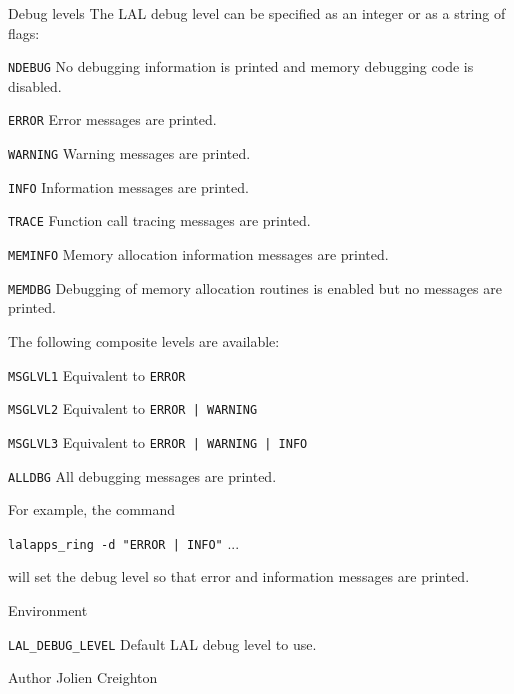 \begin{entry}
\item[Debug levels]
The LAL debug level can be specified as an integer or as a string of flags:
\begin{entry}
\item[\texttt{NDEBUG}]
No debugging information is printed and memory debugging code is disabled.
\item[\texttt{ERROR}]
Error messages are printed.
\item[\texttt{WARNING}]
Warning messages are printed.
\item[\texttt{INFO}]
Information messages are printed.
\item[\texttt{TRACE}]
Function call tracing messages are printed.
\item[\texttt{MEMINFO}]
Memory  allocation  information messages are printed.
\item[\texttt{MEMDBG}]
Debugging of memory allocation routines is enabled but no messages are printed.
\end{entry}
The following composite levels are available:
\begin{entry}
\item[\texttt{MSGLVL1}]
Equivalent to \verb$ERROR$
\item[\texttt{MSGLVL2}]
Equivalent to \verb$ERROR | WARNING$
\item[\texttt{MSGLVL3}]
Equivalent to \verb$ERROR | WARNING | INFO$
\item[\texttt{ALLDBG}]
All debugging messages are printed.
\end{entry}

For example, the command
\begin{indented}
\verb$lalapps_ring -d "ERROR | INFO"$ ...
\end{indented}
will set the debug level so that error and information messages are printed.

\item[Environment]\leavevmode

\begin{entry}
\item[\texttt{LAL\_DEBUG\_LEVEL}]
Default LAL debug level to use.
\end{entry}

\item[Author]
Jolien Creighton

\end{entry}

